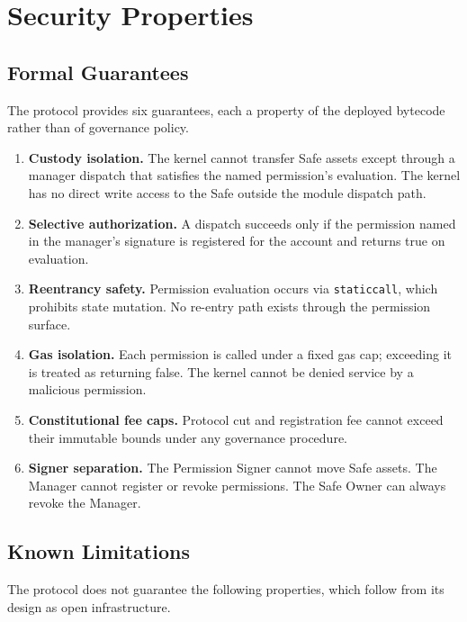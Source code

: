 \documentclass[11pt]{article}
\begin{document}
\section{Security Properties}

\subsection{Formal Guarantees}

The protocol provides six guarantees, each a property of the deployed bytecode rather than of governance policy.

\begin{enumerate}
  \itemsep0.15em
  \item \textbf{Custody isolation.} The kernel cannot transfer Safe assets except through a manager dispatch that satisfies the named permission's evaluation. The kernel has no direct write access to the Safe outside the module dispatch path.
  \item \textbf{Selective authorization.} A dispatch succeeds only if the permission named in the manager's signature is registered for the account and returns true on evaluation.
  \item \textbf{Reentrancy safety.} Permission evaluation occurs via \texttt{staticcall}, which prohibits state mutation. No re-entry path exists through the permission surface.
  \item \textbf{Gas isolation.} Each permission is called under a fixed gas cap; exceeding it is treated as returning false. The kernel cannot be denied service by a malicious permission.
  \item \textbf{Constitutional fee caps.} Protocol cut and registration fee cannot exceed their immutable bounds under any governance procedure.
  \item \textbf{Signer separation.} The Permission Signer cannot move Safe assets. The Manager cannot register or revoke permissions. The Safe Owner can always revoke the Manager.
\end{enumerate}

\subsection{Known Limitations}
\label{sec:limitations}

The protocol does not guarantee the following properties, which follow from its design as open infrastructure.
\end{document}
